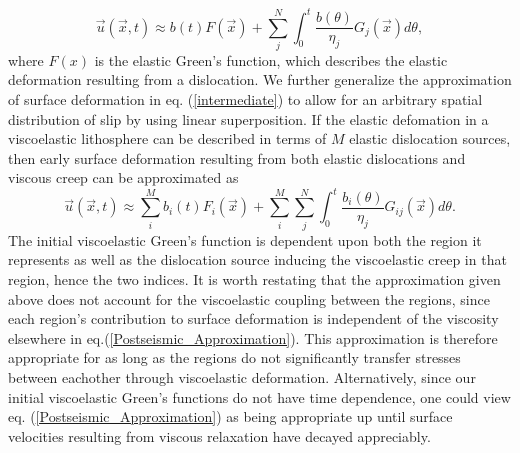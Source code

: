 \documentclass[extra]{gji}
\begin{document}
\begin{equation}\label{intermediate}
\vec{u}(\vec{x},t) \approx b(t)F(\vec{x}) + \sum_j^N\int_0^t
\frac{b(\theta)}{\eta_j}G_j(\vec{x}) d\theta,
\end{equation}
where $F(x)$ is the elastic Green's function, which describes the
elastic deformation resulting from a dislocation.  We further
generalize the approximation of surface deformation in
eq. (\ref{intermediate}) to allow for an arbitrary spatial
distribution of slip by using linear superposition.  If the elastic
defomation in a viscoelastic lithosphere can be described in terms of
$M$ elastic dislocation sources, then early surface deformation
resulting from both elastic dislocations and viscous creep can be
approximated as 
\begin{equation}\label{Postseismic_Approximation}
\vec{u}(\vec{x},t) \approx \sum_i^Mb_i(t)F_i(\vec{x}) +
\sum_i^M\sum_j^N\int_0^t\frac{b_i(\theta)}{\eta_j}G_{ij}(\vec{x}) d\theta.
\end{equation}
The initial viscoelastic Green's function is dependent upon both the
region it represents as well as the dislocation source inducing
the viscoelastic creep in that region, hence the two indices.  It is
worth restating that the approximation given above does not account
for the viscoelastic coupling between the regions, since each region's
contribution to surface deformation is independent of the viscosity
elsewhere in eq.(\ref{Postseismic_Approximation}).  This approximation
is therefore appropriate for as long as the regions do not
significantly transfer stresses between eachother through viscoelastic
deformation.  Alternatively, since our initial viscoelastic Green's
functions do not have time dependence, one could view
eq. (\ref{Postseismic_Approximation}) as being appropriate up until
surface velocities resulting from viscous relaxation have decayed
appreciably.
\end{document}
